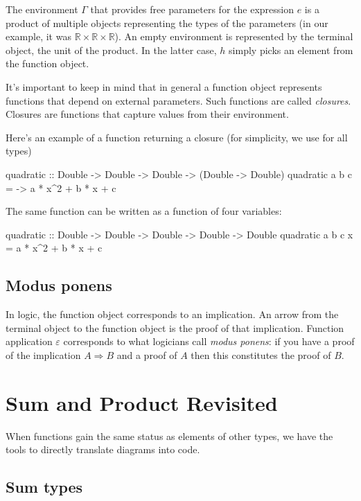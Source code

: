 \documentclass[DaoFP]{subfiles}
\begin{document}
The environment $\Gamma$ that provides free parameters for the expression $e$ is a product of multiple objects representing the types of the parameters (in our example, it was $\mathbb{R} \times \mathbb{R} \times \mathbb{R}$). An empty environment is represented by the terminal object, the unit of the product. In the latter case, $h$ simply picks an element from the function object. 

It's important to keep in mind that in general a function object represents functions that depend on external parameters. Such functions are called \emph{closures}. Closures are functions that capture values from their environment.

Here's an example of a function returning a closure (for simplicity, we use  for all types)
\begin{haskell}
quadratic :: Double -> Double -> Double -> (Double -> Double)
quadratic a b c = \x -> a * x^2 + b * x + c
\end{haskell}
The same function can be written as a function of four variables:
\begin{haskell}
quadratic :: Double -> Double -> Double -> Double -> Double
quadratic a b c x = a * x^2 + b * x + c
\end{haskell}


\subsection{Modus ponens}

In logic, the function object corresponds to an implication. An arrow from the terminal object to the function object is the proof of that implication. Function application $\varepsilon$ corresponds to what logicians call \emph{modus ponens}: if you have a proof of the implication $A \Rightarrow B$ and a proof of $A$ then this constitutes the proof of $B$.

\section{Sum and Product Revisited}

When functions gain the same status as elements of other types, we have the tools to directly translate diagrams into code. 

\subsection{Sum types}
\end{document}
